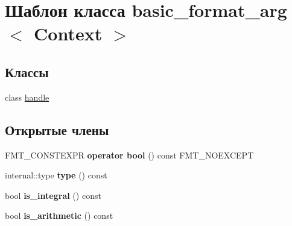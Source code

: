\hypertarget{classbasic__format__arg}{}\section{Шаблон класса basic\+\_\+format\+\_\+arg$<$ Context $>$}
\label{classbasic__format__arg}
\subsection*{Классы}
\begin{DoxyCompactItemize}
\item 
class \hyperlink{classbasic__format__arg_1_1handle}{handle}
\end{DoxyCompactItemize}
\subsection*{Открытые члены}
\begin{DoxyCompactItemize}
\item 
\mbox{\label{classbasic__format__arg_afa28ec2fdfa694b2b84992ac7f09b768}} 
F\+M\+T\+\_\+\+C\+O\+N\+S\+T\+E\+X\+PR {\bfseries operator bool} () const F\+M\+T\+\_\+\+N\+O\+E\+X\+C\+E\+PT
\item 
\mbox{\label{classbasic__format__arg_adf7349643b80568c84a5872b89b2f141}} 
internal\+::type {\bfseries type} () const
\item 
\mbox{\label{classbasic__format__arg_af7036c26bebf95df5766215ec9c1ec06}} 
bool {\bfseries is\+\_\+integral} () const
\item 
\mbox{\label{classbasic__format__arg_a14c5f1e0b933900dbc2d6fe1b6fd5ae1}} 
bool {\bfseries is\+\_\+arithmetic} () const
\end{DoxyCompactItemize}
